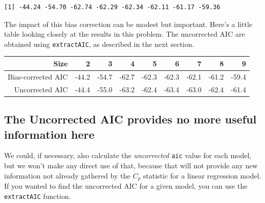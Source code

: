 \documentclass[]{book}
\newenvironment{Shaded}{\begin{snugshade}}{\end{snugshade}}
\newcommand{\KeywordTok}[1]{\textcolor[rgb]{0.13,0.29,0.53}{\textbf{#1}}}
\newcommand{\DecValTok}[1]{\textcolor[rgb]{0.00,0.00,0.81}{#1}}
\newcommand{\StringTok}[1]{\textcolor[rgb]{0.31,0.60,0.02}{#1}}
\newcommand{\CommentTok}[1]{\textcolor[rgb]{0.56,0.35,0.01}{\textit{#1}}}
\newcommand{\OperatorTok}[1]{\textcolor[rgb]{0.81,0.36,0.00}{\textbf{#1}}}
\newcommand{\NormalTok}[1]{#1}
\theoremstyle{definition}
\theoremstyle{definition}
\theoremstyle{definition}
\theoremstyle{remark}
\begin{document}
\begin{Shaded}
\end{Shaded}

\begin{verbatim}
[1] -44.24 -54.70 -62.74 -62.29 -62.34 -62.11 -61.17 -59.36
\end{verbatim}

The impact of this bias correction can be modest but important. Here's a
little table looking closely at the results in this problem. The
uncorrected AIC are obtained using \texttt{extractAIC}, as described in
the next section.

\begin{longtable}[]{@{}rrrrrrrrr@{}}
\toprule
Size & 2 & 3 & 4 & 5 & 6 & 7 & 8 & 9\tabularnewline
\midrule
\endhead
Bias-corrected AIC & -44.2 & -54.7 & -62.7 & -62.3 & -62.3 & -62.1 &
-61.2 & -59.4\tabularnewline
Uncorrected AIC & -44.4 & -55.0 & -63.2 & -62.4 & -63.4 & -63.0 & -62.4
& -61.4\tabularnewline
\bottomrule
\end{longtable}

\subsection{The Uncorrected AIC provides no more useful information
here}\label{the-uncorrected-aic-provides-no-more-useful-information-here}

We could, if necessary, also calculate the \emph{uncorrected}
\texttt{aic} value for each model, but we won't make any direct use of
that, because that will not provide any new information not already
gathered by the \(C_p\) statistic for a linear regression model. If you
wanted to find the uncorrected AIC for a given model, you can use the
\texttt{extractAIC} function.
\end{document}
